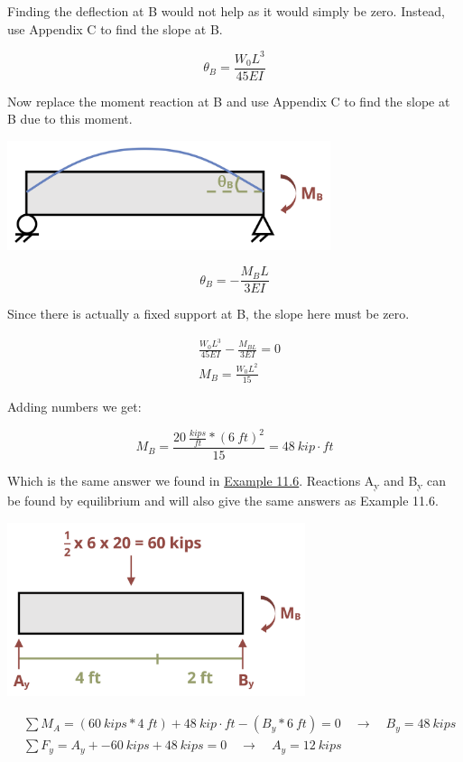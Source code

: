 \documentclass[
  letterpaper,
  DIV=11,
  numbers=noendperiod]{scrreprt}
\theoremstyle{definition}
\theoremstyle{remark}
\begin{document}
\begin{tcolorbox}
\begin{tcolorbox}
Finding the deflection at B would not help as it would simply be zero.
Instead, use Appendix C to find the slope at B.

\[
\theta_B=\frac{W_0 L^3}{45 E I}
\]

Now replace the moment reaction at B and use Appendix C to find the
slope at B due to this moment.

\begin{center}
\includegraphics[width=3.72917in,height=\textheight]{images/CH11 PNGs/example11.7v2-3.png}
\end{center}

\[
\theta_B=-\frac{M_B L}{3 E I}
\]

Since there is actually a fixed support at B, the slope here must be
zero.

\[
\begin{aligned} &\frac{W_0 L^3}{45 E I}-\frac{M_{B L}}{3 E I}=0 \\ &M_B  =\frac{W_0 L^2}{15}\end{aligned}
\]

Adding numbers we get:

\[
M_B=\frac{20~\frac{kips}{ft}*(6{~ft})^2}{15}=48{~kip}\cdot{ft}
\]

Which is the same answer we found in \hyperref[example-11.6]{Example
11.6}. Reactions A\textsubscript{y} and B\textsubscript{y} can be found
by equilibrium and will also give the same answers as Example 11.6.

\begin{center}
\includegraphics[width=3.4375in,height=\textheight]{images/clipboard-736394062.png}
\end{center}

\[
\begin{aligned}
&\sum M_A=(60{~kips}*4{~ft})+48{~kip}\cdot{ft}-(B_y*6{~ft})=0 \quad\rightarrow\quad B_y=48{~kips} \\
&\sum F_y=A_y+-60{~kips}+48{~kips}=0 \quad\rightarrow\quad A_y=12{~kips}\\
\end{aligned}
\]

\end{tcolorbox}

\end{tcolorbox}
\end{document}

